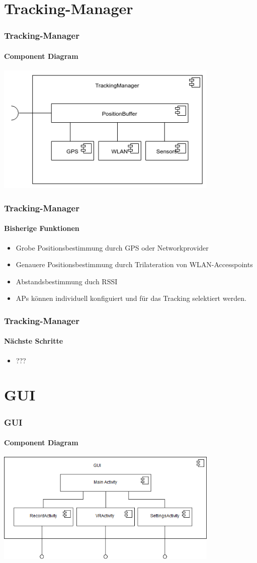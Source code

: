 \documentclass{beamer}
\begin{document}
\section{Tracking-Manager}

\begin{frame}
\frametitle{Tracking-Manager}
\framesubtitle{Component Diagram}
\hspace{1cm} \includegraphics[width=0.8\textwidth]{../doc/SDD/pics/TrackingManager_Composition.png}
\end{frame}

\begin{frame}
\frametitle{Tracking-Manager}
\framesubtitle{Bisherige Funktionen}
\begin{itemize}
  \item Grobe Positionsbestimmung durch GPS oder Networkprovider
  \item	Genauere Positionsbestimmung durch Trilateration von WLAN-Accesspoints
  \item	Abstandsbestimmung duch RSSI
  \item	APs k\"onnen individuell konfiguiert und f\"ur das Tracking selektiert werden. 
\end{itemize}
\end{frame}

\begin{frame}
\frametitle{Tracking-Manager}
\framesubtitle{N\"achste Schritte}
\begin{itemize}
  \item ???
\end{itemize}
\end{frame}

\section{GUI}

\begin{frame}
\frametitle{GUI}
\framesubtitle{Component Diagram}
\hspace{1cm} \includegraphics[width=0.8\textwidth]{../doc/SDD/pics/GUI-Component.png}
\end{frame}
\end{document}
